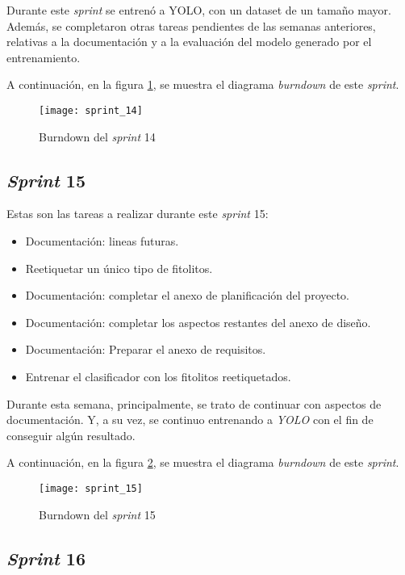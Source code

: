 Durante este \textit{sprint} se entrenó a YOLO, con un dataset de un tamaño mayor. Además, se completaron otras tareas pendientes de las semanas anteriores, relativas a la documentación y a la evaluación del modelo generado por el entrenamiento.

A continuación, en la figura \ref{fig:A.1.15}, se muestra el diagrama \textit{burndown} de este \textit{sprint}.

\begin{figure}
\centering
\texttt{[image: sprint\_14]}
\caption{Burndown del \textit{sprint} 14}
\label{fig:A.1.15}
\end{figure}

\subsection{\textit{Sprint} 15}

Estas son las tareas a realizar durante este \textit{sprint} 15:

\begin{itemize}
	\item Documentación: lineas futuras.
	\item Reetiquetar un único tipo de fitolitos.
	\item Documentación: completar el anexo de planificación del proyecto.
	\item Documentación: completar los aspectos restantes del anexo de diseño.
	\item Documentación: Preparar el anexo de requisitos.
	\item Entrenar el clasificador con los fitolitos reetiquetados.
\end{itemize}

Durante esta semana, principalmente, se trato de continuar con aspectos de documentación. Y, a su vez, se continuo entrenando a \textit{YOLO} con el fin de conseguir algún resultado. 

A continuación, en la figura \ref{fig:A.1.16}, se muestra el diagrama \textit{burndown} de este \textit{sprint}.

\begin{figure}
\centering
\texttt{[image: sprint\_15]}
\caption{Burndown del \textit{sprint} 15}
\label{fig:A.1.16}
\end{figure}

\subsection{\textit{Sprint} 16}

